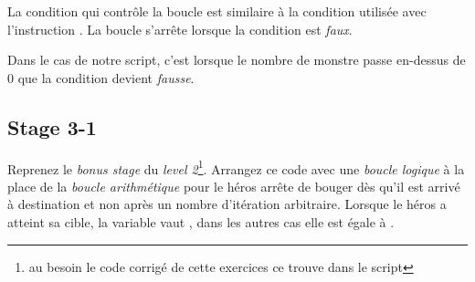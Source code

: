 La condition qui contrôle la boucle est similaire à la condition utilisée avec l'instruction .
La boucle s'arrête lorsque la condition est \emph{faux}.

Dans le cas de notre script, c'est lorsque le nombre de monstre passe en-dessus de 0 que la condition devient \emph{fausse}.

\subsection{Stage 3-1}

Reprenez le \textit{bonus stage} du \textit{level 2}\footnote{au besoin le code corrigé de cette exercices ce trouve dans le script }. Arrangez ce code avec une \emph{boucle logique} à la place de la \emph{boucle arithmétique} pour le héros arrête de bouger dès qu'il est arrivé à destination et non après un nombre d'itération arbitraire.
Lorsque le héros a atteint sa cible, la variable  vaut , dans les autres cas elle est égale à .


